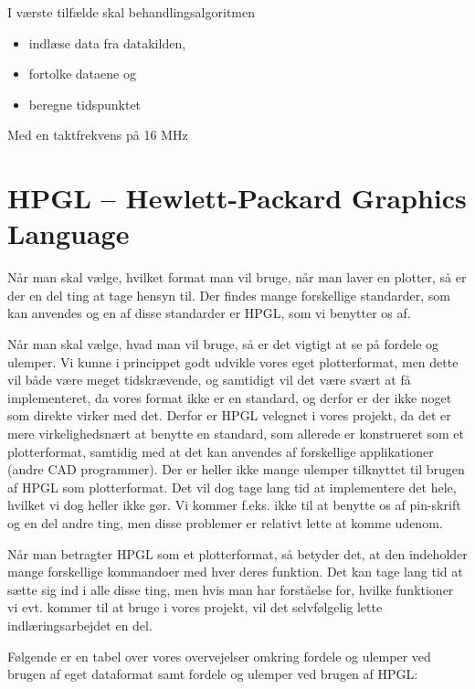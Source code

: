 I værste tilfælde skal behandlingsalgoritmen
\begin{itemize}
\item indlæse data fra datakilden,
\item fortolke dataene og
\item beregne tidspunktet
\end{itemize}

Med en taktfrekvens på 16 MHz


\section{HPGL -- Hewlett-Packard Graphics Language}

Når man skal vælge, hvilket format man vil bruge, når man laver en
plotter, så er der en del ting at tage hensyn til. Der findes mange
forskellige standarder, som kan anvendes og en af disse standarder er
HPGL, som vi benytter os af.

Når man skal vælge, hvad man vil bruge, så er det vigtigt at se på
fordele og ulemper. Vi kunne i princippet godt udvikle vores eget
plotterformat, men dette vil både være meget tidskrævende, og
samtidigt vil det være svært at få implementeret, da vores format ikke
er en standard, og derfor er der ikke noget som direkte virker med
det. Derfor er HPGL velegnet i vores projekt, da det er mere
virkelighedsnært at benytte en standard, som allerede er konstrueret
som et plotterformat, samtidig med at det kan anvendes af forskellige
applikationer (andre CAD programmer). Der er heller ikke mange ulemper
tilknyttet til brugen af HPGL som plotterformat. Det vil dog tage lang
tid at implementere det hele, hvilket vi dog heller ikke gør. Vi
kommer f.eks. ikke til at benytte os af pin-skrift og en del andre
ting, men disse problemer er relativt lette at komme udenom.

Når man betragter HPGL som et plotterformat, så betyder det, at den
indeholder mange forskellige kommandoer med hver deres funktion. Det
kan tage lang tid at sætte sig ind i alle disse ting, men hvis man har
forståelse for, hvilke funktioner vi evt. kommer til at bruge i vores
projekt, vil det selvfølgelig lette indlæringsarbejdet en del.

Følgende er en tabel over vores overvejelser omkring fordele og
ulemper ved brugen af eget dataformat samt fordele og ulemper ved
brugen af HPGL:


